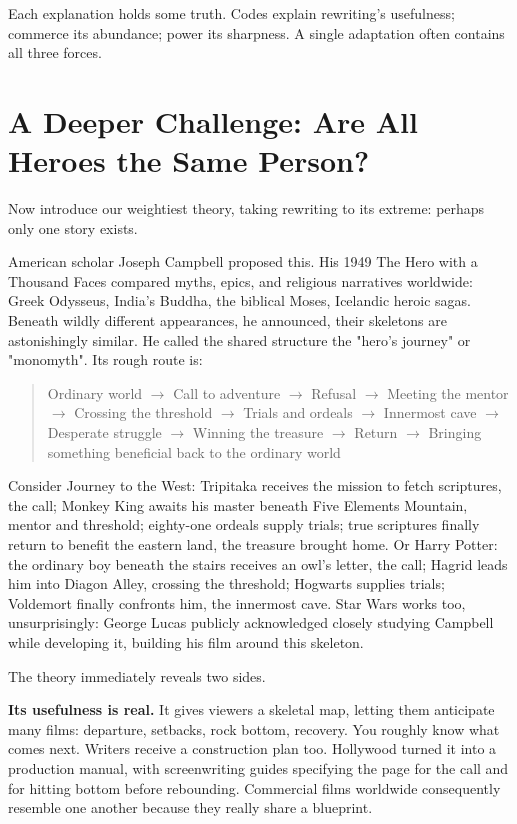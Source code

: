 Each explanation holds some truth. Codes explain rewriting's usefulness; commerce its abundance; power its sharpness. A single adaptation often contains all three forces.

\section[Further Challenge: One Hero, Many Faces?]{A Deeper Challenge: Are All Heroes the Same Person?}
Now introduce our weightiest theory, taking rewriting to its extreme: perhaps only one story exists.

American scholar Joseph Campbell proposed this. His 1949 The Hero with a Thousand Faces compared myths, epics, and religious narratives worldwide: Greek Odysseus, India's Buddha, the biblical Moses, Icelandic heroic sagas. Beneath wildly different appearances, he announced, their skeletons are astonishingly similar. He called the shared structure the "hero's journey" or "monomyth". Its rough route is:

\begin{quote}
Ordinary world $\rightarrow$ Call to adventure $\rightarrow$ Refusal $\rightarrow$ Meeting the mentor $\rightarrow$ Crossing the threshold $\rightarrow$ Trials and ordeals $\rightarrow$ Innermost cave $\rightarrow$ Desperate struggle $\rightarrow$ Winning the treasure $\rightarrow$ Return $\rightarrow$ Bringing something beneficial back to the ordinary world
\end{quote}
Consider Journey to the West: Tripitaka receives the mission to fetch scriptures, the call; Monkey King awaits his master beneath Five Elements Mountain, mentor and threshold; eighty-one ordeals supply trials; true scriptures finally return to benefit the eastern land, the treasure brought home. Or Harry Potter: the ordinary boy beneath the stairs receives an owl's letter, the call; Hagrid leads him into Diagon Alley, crossing the threshold; Hogwarts supplies trials; Voldemort finally confronts him, the innermost cave. Star Wars works too, unsurprisingly: George Lucas publicly acknowledged closely studying Campbell while developing it, building his film around this skeleton.

The theory immediately reveals two sides.

\textbf{Its usefulness is real.} It gives viewers a skeletal map, letting them anticipate many films: departure, setbacks, rock bottom, recovery. You roughly know what comes next. Writers receive a construction plan too. Hollywood turned it into a production manual, with screenwriting guides specifying the page for the call and for hitting bottom before rebounding. Commercial films worldwide consequently resemble one another because they really share a blueprint.

